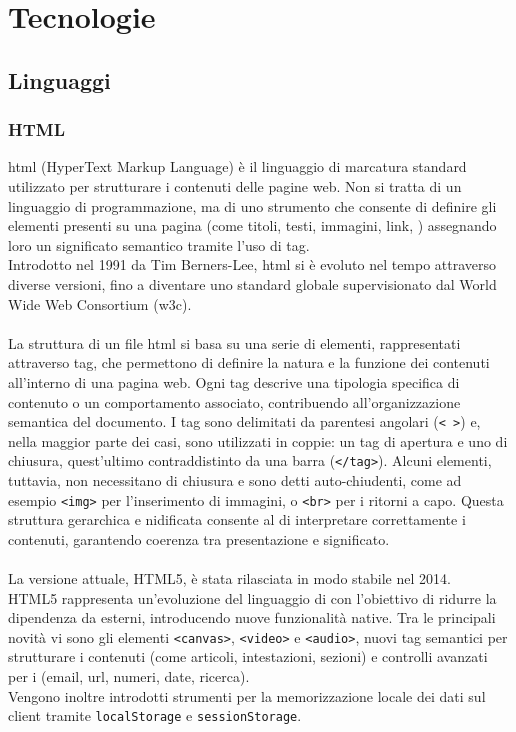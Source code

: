 \chapter{Tecnologie}
\label{chap:linguaggi-tecnologie}

\section{Linguaggi}
\subsection{HTML}
\noindent \acrshort{html} (HyperText Markup Language) è il linguaggio di marcatura standard utilizzato per strutturare i contenuti delle pagine web. Non si tratta di un linguaggio di programmazione, ma di uno strumento che consente di definire gli elementi presenti su una pagina (come titoli, testi, immagini, link, ) assegnando loro un significato semantico tramite l’uso di tag. \\
Introdotto nel 1991 da Tim Berners-Lee, \acrshort{html} si è evoluto nel tempo attraverso diverse versioni, fino a diventare uno standard globale supervisionato dal World Wide Web Consortium (\acrshort{w3c}).\\
\\
La struttura di un file \acrshort{html} si basa su una serie di elementi, rappresentati attraverso tag, che permettono di definire la natura e la funzione dei contenuti all'interno di una pagina web. Ogni tag descrive una tipologia specifica di contenuto o un comportamento associato, contribuendo all'organizzazione semantica del documento. I tag sono delimitati da parentesi angolari (\texttt{< >}) e, nella maggior parte dei casi, sono utilizzati in coppie: un tag di apertura e uno di chiusura, quest’ultimo contraddistinto da una barra (\texttt{</tag>}). Alcuni elementi, tuttavia, non necessitano di chiusura e sono detti auto-chiudenti, come ad esempio \texttt{<img>} per l’inserimento di immagini, o \texttt{<br>} per i ritorni a capo. Questa struttura gerarchica e nidificata consente al  di interpretare correttamente i contenuti, garantendo coerenza tra presentazione e significato.\\
\\
La versione attuale, HTML5, è stata rilasciata in modo stabile nel 2014.\\
HTML5 rappresenta un’evoluzione del linguaggio di  con l’obiettivo di ridurre la dipendenza da  esterni, introducendo nuove funzionalità native. Tra le principali novità vi sono gli elementi \texttt{<canvas>}, \texttt{<video>} e \texttt{<audio>}, nuovi tag semantici per strutturare i contenuti (come articoli, intestazioni, sezioni) e controlli avanzati per i  (email, \acrshort{url}, numeri, date, ricerca). 
\\Vengono inoltre introdotti strumenti per la memorizzazione locale dei dati sul client tramite \texttt{localStorage} e \texttt{sessionStorage}.

